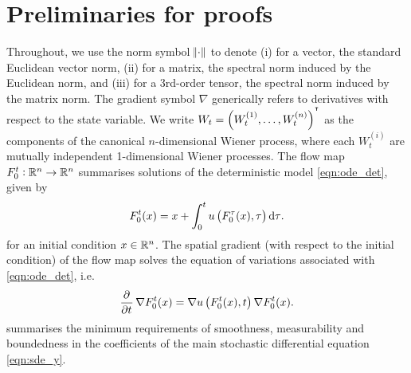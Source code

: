\section{Preliminaries for proofs}\label{app:gauss}

Throughout, we use the norm symbol \(\norm{\cdot}\) to denote (i) for a vector, the standard Euclidean vector norm, (ii) for a matrix, the spectral norm induced by the Euclidean norm, and (iii) for a 3rd-order tensor, the spectral norm induced by the matrix norm.
The gradient symbol \(\nabla\) generically refers to derivatives with respect to the state variable.
We write \(W_t = \left(W_t^{(1)}, \hdots, W_t^{(n)}\right)^{^{\intercal}}\) as the components of the canonical \(n\)-dimensional Wiener process, where each \(W_t^{(i)}\) are mutually independent 1-dimensional Wiener processes.
The flow map \(F_0^t: \mathbb{R}^n \to \mathbb{R}^n\) summarises solutions of the deterministic model \eqref{eqn:ode_det}, given by
\begin{equation}
	F_{0}^{t}(x) = x + \int_{0}^{t}{u\left(F_{0}^{\tau}(x), \tau\right)\dif \tau}.
	\label{eqn:flow_map_int}
\end{equation}
for an initial condition \(x \in \mathbb{R}^n\).
The spatial gradient (with respect to the initial condition) of the flow map solves the equation of variations associated with \eqref{eqn:ode_det}, i.e.
\begin{equation}
	\dpd{}{t}\nabla F_0^t(x) = \nabla u\left(F_0^t(x), t\right)\nabla F_0^t(x).
	\label{eqn:eqn_of_vars}
\end{equation}
 summarises the minimum requirements of smoothness, measurability and boundedness in the coefficients of the main stochastic differential equation \eqref{eqn:sde_y}.

